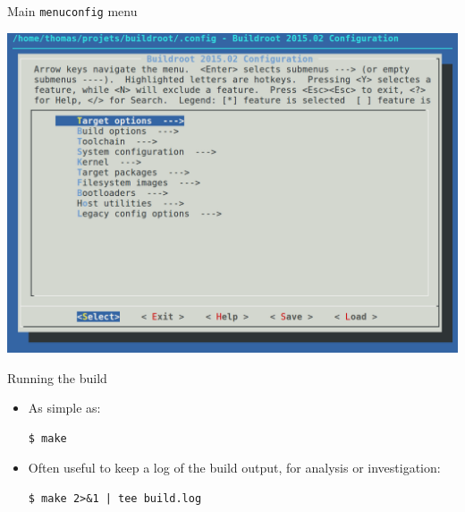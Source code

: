 \begin{frame}{Main {\tt menuconfig} menu}
  \begin{center}
    \includegraphics[width=\textwidth]{slides/buildroot-introduction/menuconfig.png}
  \end{center}
\end{frame}

\begin{frame}[fragile]{Running the build}
  \begin{itemize}
  \item As simple as:
    \begin{block}{}
\begin{verbatim}
$ make
\end{verbatim}
    \end{block}
  \item Often useful to keep a log of the build output, for analysis
    or investigation:
    \begin{block}{}
\begin{verbatim}
$ make 2>&1 | tee build.log
\end{verbatim}
    \end{block}
  \end{itemize}
\end{frame}

